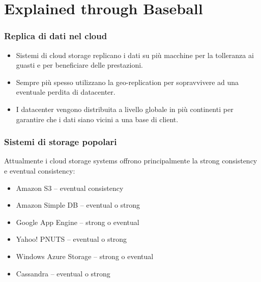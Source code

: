 \section{Explained through Baseball}

\begin{frame}
 \frametitle{Replica di dati nel cloud}
 \begin{itemize}
   \item Sistemi di cloud storage replicano i dati su più macchine per la tolleranza ai guasti e per beneficiare delle prestazioni.
   \item Sempre più spesso utilizzano la geo-replication per sopravvivere ad una eventuale perdita di datacenter.
   \item I datacenter vengono distribuita a livello globale in più continenti per garantire che i dati siano vicini a una base di client.
 \end{itemize}
  
\end{frame}

\begin{frame}
 \frametitle{Sistemi di storage popolari}
Attualmente i cloud storage systems offrono principalmente la strong consistency e eventual consistency:
 \begin{itemize}
   \item Amazon S3 – eventual consistency
   \item Amazon Simple DB – eventual o strong
   \item Google App Engine – strong o eventual
   \item Yahoo! PNUTS – eventual o strong
   \item Windows Azure Storage – strong o eventual
   \item Cassandra – eventual o strong
 \end{itemize}
\end{frame}

